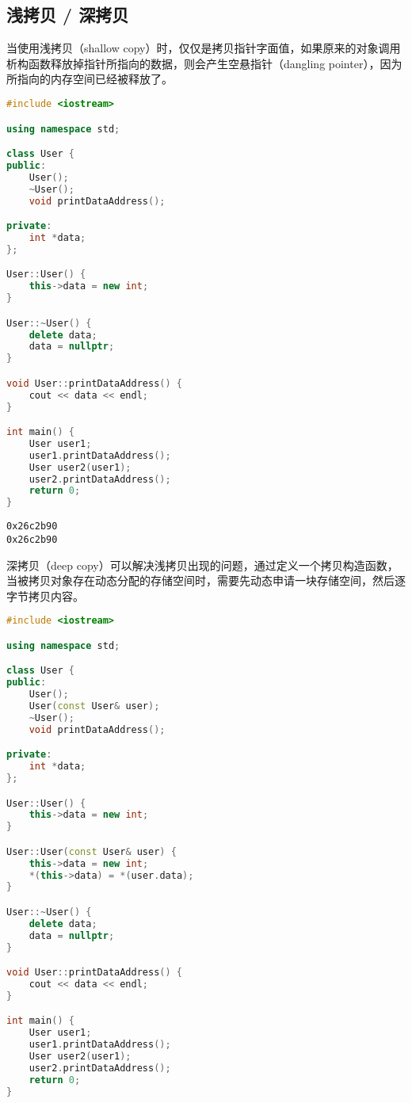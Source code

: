 \subsection{浅拷贝 / 深拷贝}

当使用浅拷贝（shallow copy）时，仅仅是拷贝指针字面值，如果原来的对象调用析构函数释放掉指针所指向的数据，则会产生空悬指针（dangling pointer），因为所指向的内存空间已经被释放了。 \\


\begin{lstlisting}[language=C++]
#include <iostream>

using namespace std;

class User {
public:
    User();
    ~User();
    void printDataAddress();

private:
    int *data;
};

User::User() {
    this->data = new int;
}

User::~User() {
    delete data;
    data = nullptr;
}

void User::printDataAddress() {
    cout << data << endl;
}

int main() {
    User user1;
    user1.printDataAddress();
    User user2(user1);
    user2.printDataAddress();  
    return 0;
}
\end{lstlisting}

\begin{tcolorbox}
	\begin{verbatim}
0x26c2b90
0x26c2b90
	\end{verbatim}
\end{tcolorbox}

深拷贝（deep copy）可以解决浅拷贝出现的问题，通过定义一个拷贝构造函数，当被拷贝对象存在动态分配的存储空间时，需要先动态申请一块存储空间，然后逐字节拷贝内容。 \\


\begin{lstlisting}[language=C++]
#include <iostream>

using namespace std;

class User {
public:
    User();
    User(const User& user);
    ~User();
    void printDataAddress();

private:
    int *data;
};

User::User() {
    this->data = new int;
}

User::User(const User& user) {
    this->data = new int;
    *(this->data) = *(user.data);
}

User::~User() {
    delete data;
    data = nullptr;
}

void User::printDataAddress() {
    cout << data << endl;
}

int main() {
    User user1;
    user1.printDataAddress();
    User user2(user1);
    user2.printDataAddress();  
    return 0;
}
\end{lstlisting}

